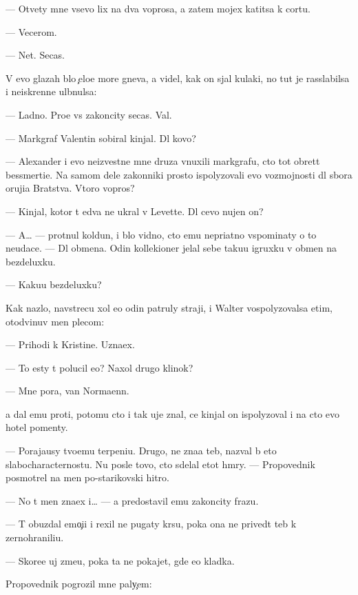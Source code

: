 \documentclass[10pt]{book}
\begin{document}
— Otvety mne vsevo lix na dva voprosa, a zatem mojex katitsa k cortu.

— Vecerom.

— Net. Se{\y}cas.

V {\y}evo glazah b{\yi}lo {\c}elo{\y}e more gneva, {\y}a videl, kak on sjal kulaki, no tut je rasslabilsa i neiskrenne ul{\yi}bnulsa:

— Ladno. Pro{\x}e vs{\e} zakoncity se{\y}cas. Val{\ia}{\y}.

— Markgraf Valentin sobiral kinjal{\yi}. Dl{\ia} kovo?

— Alexander i {\y}evo neizvestn{\yi}{\y}e mne druz{\y}a vnuxili markgrafu, cto tot obret{\e}t bessmerti{\y}e. Na samom dele zakonniki prosto ispolyzovali {\y}evo vozmojnosti dl{\ia} sbo\-ra oruji{\y}a Bratstva. Vtoro{\y} vopros?

— Kinjal, kotor{\yi}{\y} t{\yi} {\y}edva ne ukral v Levette. Dl{\ia} cevo nujen on?

— A… — pro\-t{\ia}\-nul koldun, i b{\yi}lo vidno, cto {\y}emu nepri{\y}atno vspominaty o to{\y} neudace. — Dl{\ia} obmena. Odin kollek\-{\c}ioner jelal sebe taku{\y}u igruxku v obmen na bezdeluxku.

— Kaku{\y}u bezdeluxku?

Kak nazlo, navstrecu xol {\y}e{\x}o odin patruly straji, i Walter vospolyzovalsa etim, otodvinuv men{\ia} plecom:

— Prihodi k Kristine. Uzna{\y}ex.

— To {\y}esty t{\yi} polucil {\y}e{\y}o? Naxol drugo{\y} klinok?

— Mne pora, van Normaenn.

{\Y}a dal {\y}emu pro{\y}ti, potomu cto i tak uje znal, ce{\y} kinjal on ispolyzoval i na cto {\y}evo hotel pomen{\ia}ty.



— Poraja{\y}usy tvo{\y}emu terpeni{\y}u. Drugo{\y}, ne zna{\y}a teb{\ia}, nazval b{\yi} eto slabo\-character\-no\-st{\y}u. Nu posle tovo, cto sdelal etot hm{\yi}ry. — Pro\-po\-ved\-nik posmotrel na men{\ia} po-starikovski hitro.

— No t{\yi} men{\ia} zna\-{\y}ex i… — {\Y}a predostavil {\y}emu zakoncity frazu.

— T{\yi} obuzdal emo{\c}i{\y}i i rexil ne pugaty kr{\yi}su, poka ona ne prived{\e}t teb{\ia} k zernohranili{\x}u.

— Skore{\y}e uj zme{\y}u, poka ta ne pokajet, gde {\y}e{\y}o kladka.

Pro\-po\-ved\-nik pogrozil mne paly{\c}em:
\end{document}
